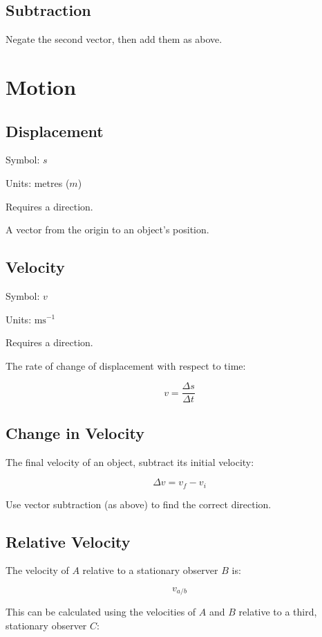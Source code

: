 \documentclass[a4paper,11pt]{report}
\begin{document}
\subsection{Subtraction}

Negate the second vector, then add them as above.


\section{Motion}

\subsection{Displacement}

Symbol: $s$

Units: metres ($m$)

Requires a direction.

A vector from the origin to an object's position.

\subsection{Velocity}

Symbol: $v$

Units: $\mbox{ms}^{-1}$

Requires a direction.

The rate of change of displacement with respect to time:

$$
v = \frac{\Delta s}{\Delta t}
$$

\subsection{Change in Velocity}

The final velocity of an object, subtract its initial velocity:

$$
\Delta v = v_f - v_i
$$

Use vector subtraction (as above) to find the correct direction.

\subsection{Relative Velocity}

The velocity of $A$ relative to a stationary observer $B$ is:

$$
v_{a/b}
$$

This can be calculated using the velocities of $A$ and $B$ relative to a third,
stationary observer $C$:
\end{document}
